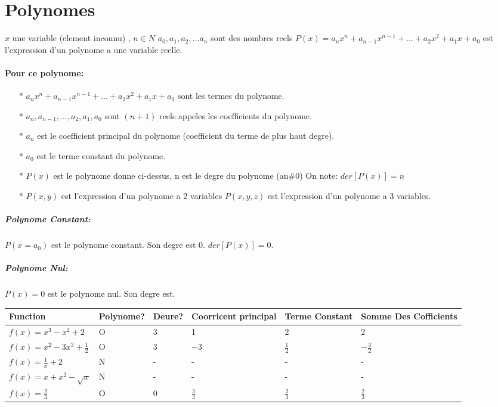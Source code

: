 \documentclass{article}
\begin{document}
\section{Polynomes}
$x$ une variable (element inconnu) , $n \in N$  $a_0,a_1,a_2,\ldots a_n$ sont
des nombres reels
$P(x) = a_nx^n+a_{n-1}x^{n-1}+ \ldots + a_2x^2+ a_1x + a_0$ est l'expression
d'un polynome a une variable reelle.
\paragraph{Pour ce polynome:}
\begin{itemize}
\item[$\ast$] $a_nx^n+a_{n-1}x^{n-1}+ \ldots + a_2x^2+ a_1x + a_0$ sont les
termes du polynome.
\item[$\ast$] $a_n,a_{n-1}, \ldots , a_2, a_1 , a_0$ sont $(n+1)$ reels appeles
les coefficients du polynome.
\item[$\ast$] $a_n$ est le coefficient principal du polynome (coefficient du
terme de plus haut degre).
\item[$\ast$] $a_0$ est le terme constant du polynome.
\item[$\ast$] $P(x)$ est le polynome donne ci-dessus, n est le degre du polynome
(an\#$0$) On note: $der[P(x)]=n$
\item[$\ast$]$P(x, y)$ est l'expression d'un polynome a 2 variables $P(x,y,z)$
est l'expression d'un polynome a 3 variables.
\end{itemize}
\subparagraph{Polynome Constant:}
$P(x=a_0)$ est le polynome constant. Son degre est 0. $der[P(x)]=0$.
\subparagraph{Polynome Nul:}
$P(x)=0$ est le polynome nul. Son degre est.
\begin{center}
    \begin{tabular}{ | l | l | l | l | l | l |}
    \hline
    Function & Polynome? & Deure? & Coorricent principal & Terme Constant &
    Somme Des Cofficients\\ \hline 
    $f(x)=x^3-x^2+2$ & O & 3 & 1 & 2 & 2\\ \hline
    $f(x)=x^2-3x^3+\frac{1}{2}$ & O & $3$ & $-3$ & $\frac{1}{2}$ &
    $-\frac{3}{2}$ \\ \hline 
    $f(x)=\frac{1}{x}+2$  & N & - & - & - & - \\ \hline
    $f(x)=x+x^2-\sqrt{x}$  & N & - & - & - & - \\ \hline
    $f(x)=\frac{2}{3}$  & O & $0$ & $\frac{2}{3}$ & $\frac{2}{3}$ &
    $\frac{2}{3}$
    \\
    \hline
    
    \end{tabular}
\end{center}
\end{document}
